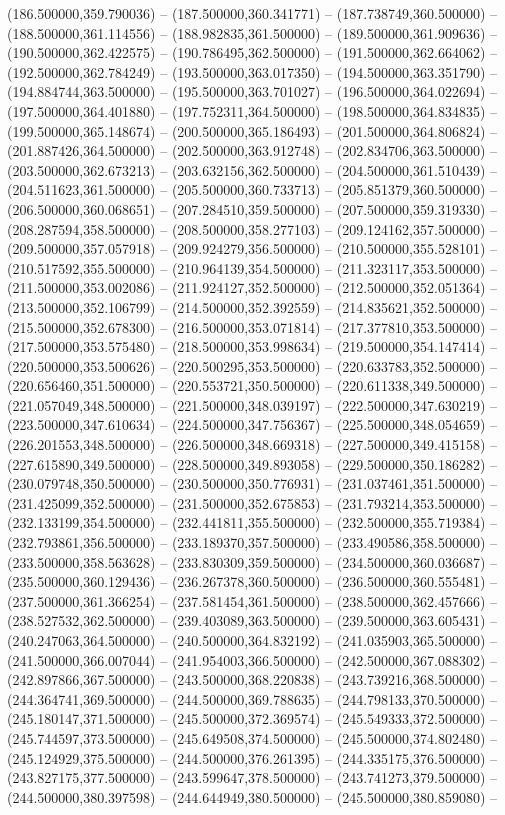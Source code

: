 (186.500000,359.790036) -- (187.500000,360.341771) -- (187.738749,360.500000) -- (188.500000,361.114556) -- (188.982835,361.500000) -- (189.500000,361.909636) -- (190.500000,362.422575) -- (190.786495,362.500000) -- (191.500000,362.664062) -- (192.500000,362.784249) -- (193.500000,363.017350) -- (194.500000,363.351790) -- (194.884744,363.500000) -- (195.500000,363.701027) -- (196.500000,364.022694) -- (197.500000,364.401880) -- (197.752311,364.500000) -- (198.500000,364.834835) -- (199.500000,365.148674) -- (200.500000,365.186493) -- (201.500000,364.806824) -- (201.887426,364.500000) -- (202.500000,363.912748) -- (202.834706,363.500000) -- (203.500000,362.673213) -- (203.632156,362.500000) -- (204.500000,361.510439) -- (204.511623,361.500000) -- (205.500000,360.733713) -- (205.851379,360.500000) -- (206.500000,360.068651) -- (207.284510,359.500000) -- (207.500000,359.319330) -- (208.287594,358.500000) -- (208.500000,358.277103) -- (209.124162,357.500000) -- (209.500000,357.057918) -- (209.924279,356.500000) -- (210.500000,355.528101) -- (210.517592,355.500000) -- (210.964139,354.500000) -- (211.323117,353.500000) -- (211.500000,353.002086) -- (211.924127,352.500000) -- (212.500000,352.051364) -- (213.500000,352.106799) -- (214.500000,352.392559) -- (214.835621,352.500000) -- (215.500000,352.678300) -- (216.500000,353.071814) -- (217.377810,353.500000) -- (217.500000,353.575480) -- (218.500000,353.998634) -- (219.500000,354.147414) -- (220.500000,353.500626) -- (220.500295,353.500000) -- (220.633783,352.500000) -- (220.656460,351.500000) -- (220.553721,350.500000) -- (220.611338,349.500000) -- (221.057049,348.500000) -- (221.500000,348.039197) -- (222.500000,347.630219) -- (223.500000,347.610634) -- (224.500000,347.756367) -- (225.500000,348.054659) -- (226.201553,348.500000) -- (226.500000,348.669318) -- (227.500000,349.415158) -- (227.615890,349.500000) -- (228.500000,349.893058) -- (229.500000,350.186282) -- (230.079748,350.500000) -- (230.500000,350.776931) -- (231.037461,351.500000) -- (231.425099,352.500000) -- (231.500000,352.675853) -- (231.793214,353.500000) -- (232.133199,354.500000) -- (232.441811,355.500000) -- (232.500000,355.719384) -- (232.793861,356.500000) -- (233.189370,357.500000) -- (233.490586,358.500000) -- (233.500000,358.563628) -- (233.830309,359.500000) -- (234.500000,360.036687) -- (235.500000,360.129436) -- (236.267378,360.500000) -- (236.500000,360.555481) -- (237.500000,361.366254) -- (237.581454,361.500000) -- (238.500000,362.457666) -- (238.527532,362.500000) -- (239.403089,363.500000) -- (239.500000,363.605431) -- (240.247063,364.500000) -- (240.500000,364.832192) -- (241.035903,365.500000) -- (241.500000,366.007044) -- (241.954003,366.500000) -- (242.500000,367.088302) -- (242.897866,367.500000) -- (243.500000,368.220838) -- (243.739216,368.500000) -- (244.364741,369.500000) -- (244.500000,369.788635) -- (244.798133,370.500000) -- (245.180147,371.500000) -- (245.500000,372.369574) -- (245.549333,372.500000) -- (245.744597,373.500000) -- (245.649508,374.500000) -- (245.500000,374.802480) -- (245.124929,375.500000) -- (244.500000,376.261395) -- (244.335175,376.500000) -- (243.827175,377.500000) -- (243.599647,378.500000) -- (243.741273,379.500000) -- (244.500000,380.397598) -- (244.644949,380.500000) -- (245.500000,380.859080) -- 
